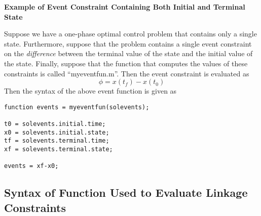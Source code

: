 \documentclass[10pt,final]{report}
\newenvironment{shadedframe}{%
  \def\FrameCommand{\fcolorbox{black}{shadecolor}}%
  \MakeFramed {\FrameRestore}}
{\endMakeFramed}
\begin{document}
\begin{shadedframe}
{\noindent}{\bf Example of Event Constraint Containing Both Initial and Terminal State}
\vspace{12pt}

{\noindent}Suppose we have a one-phase optimal control problem that contains
only a single state.  Furthermore, suppose that the problem contains a single
event constraint on the {\em difference} between the terminal value of the
state and the initial value of the state.  Finally, suppose that the function
that computes the values of these constraints is called ``myeventfun.m''.
Then the event constraint is evaluated as
\begin{displaymath}
  \phi = x(t_f)-x(t_0)
\end{displaymath}
Then the syntax of the above event function is given as
\begin{verbatim}
function events = myeventfun(solevents);

t0 = solevents.initial.time;
x0 = solevents.initial.state;
tf = solevents.terminal.time;
xf = solevents.terminal.state;

events = xf-x0;
\end{verbatim}

\end{shadedframe}

\subsection{Syntax of Function Used to Evaluate Linkage Constraints\label{sect:_Link_syntax}}
\end{document}

